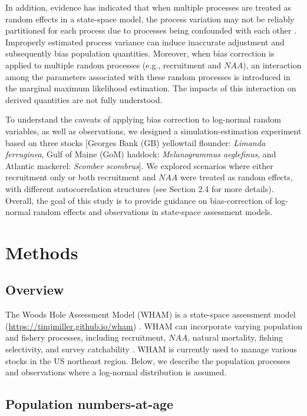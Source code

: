 \documentclass[
  12pt,
]{article}
\begin{document}
In addition, evidence has indicated that when multiple processes are
treated as random effects in a state-space model, the process variation
may not be reliably partitioned for each process due to processes being
confounded with each other
\citep{Trijoulet2020, Li2024, Liljestrand2024}. Improperly estimated
process variance can induce inaccurate adjustment and subsequently bias
population quantities. Moreover, when bias correction is applied to
multiple random processes (e.g., recruitment and \(NAA\)), an
interaction among the parameters associated with these random processes
is introduced in the marginal maximum likelihood estimation. The impacts
of this interaction on derived quantities are not fully understood.

To understand the caveats of applying bias correction to log-normal
random variables, as well as observations, we designed a
simulation-estimation experiment based on three stocks {[}Georges Bank
(GB) yellowtail flounder: \emph{Limanda ferruginea}, Gulf of Maine (GoM)
haddock: \emph{Melanogrammus aeglefinus}, and Atlantic mackerel:
\emph{Scomber scombrus}{]}. We explored scenarios where either
recruitment only or both recruitment and \(NAA\) were treated as random
effects, with different autocorrelation structures (see Section 2.4 for
more details). Overall, the goal of this study is to provide guidance on
bias-correction of log-normal random effects and observations in
state-space assessment models.

\section{Methods}\label{methods}

\subsection{Overview}\label{overview}

The Woods Hole Assessment Model (WHAM) is a state-space assessment model
(\url{https://timjmiller.github.io/wham}) \citep{Stock2021}. WHAM can
incorporate varying population and fishery processes, including
recruitment, \(NAA\), natural mortality, fishing selectivity, and survey
catchability \citep{Stock2021}. WHAM is currently used to manage various
stocks in the US northeast region. Below, we describe the population
processes and observations where a log-normal distribution is assumed.

\subsection{Population numbers-at-age}\label{population-numbers-at-age}
\end{document}
